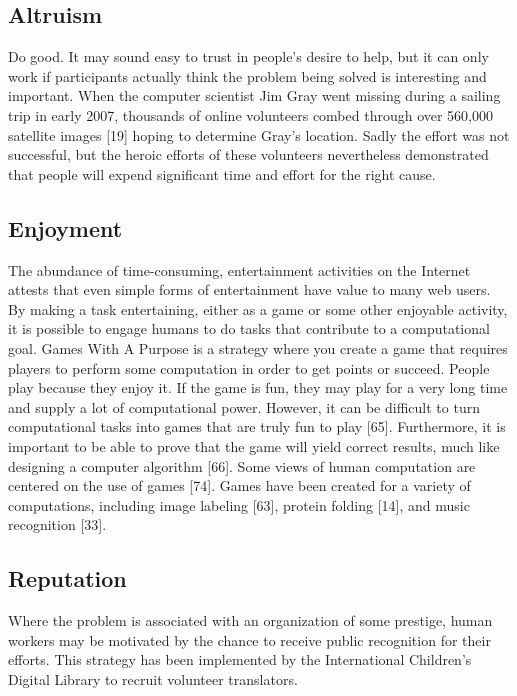 \documentclass{sig-alternate}
\begin{document}
\subsection*{Altruism}
Do good. It may sound easy to trust in people's desire to help, but it can only work if participants actually think the problem being solved is interesting and important.
When the computer scientist Jim Gray went missing during a sailing trip in early 2007, thousands of online volunteers combed through over 560,000 satellite images [19] hoping to determine Gray’s location. Sadly the effort was not successful, but the heroic efforts of these volunteers nevertheless demonstrated that people will expend significant time and effort for the right cause.
\subsection*{Enjoyment}
The abundance of time-consuming, entertainment activities on the Internet attests that even simple forms of entertainment have value to many web users. By making a task entertaining, either as a game or some other enjoyable activity, it is possible to engage humans to do tasks that contribute to a computational goal.
Games With A Purpose is a strategy where you create a game that requires players to perform some computation in order to get points or succeed. People play because they enjoy it. If the game is fun, they may play for a very long time and supply a lot of computational power. However, it can be difficult to turn computational tasks into games that are truly fun to play [65]. Furthermore, it is important to be able to prove that the game will yield correct results, much like designing a computer algorithm [66]. Some views of human computation are centered on the use of games [74]. Games have been created for a variety of computations, including image labeling [63], protein folding [14], and music recognition [33].
\subsection*{Reputation}
Where the problem is associated with an organization of some prestige, human workers may be motivated by the chance to receive public recognition for their efforts. This strategy has been implemented by the International Children's Digital Library to recruit volunteer translators.
\end{document}
